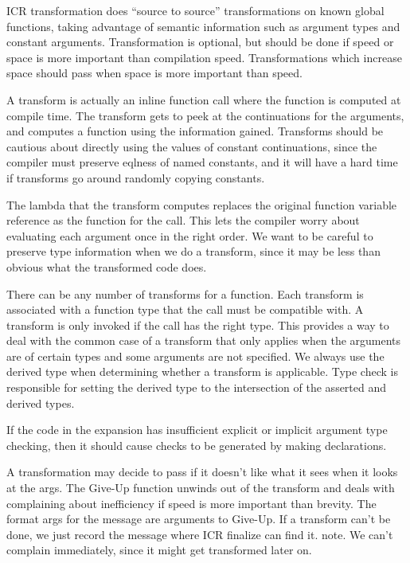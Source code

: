ICR transformation does ``source to source'' transformations on known global
functions, taking advantage of semantic information such as argument types and
constant arguments.  Transformation is optional, but should be done if speed or
space is more important than compilation speed.  Transformations which increase
space should pass when space is more important than speed.

A transform is actually an inline function call where the function is computed
at compile time.  The transform gets to peek at the continuations for the
arguments, and computes a function using the information gained.  Transforms
should be cautious about directly using the values of constant continuations,
since the compiler must preserve eqlness of named constants, and it will have a
hard time if transforms go around randomly copying constants.

The lambda that the transform computes replaces the original function variable
reference as the function for the call.  This lets the compiler worry about
evaluating each argument once in the right order.  We want to be careful to
preserve type information when we do a transform, since it may be less than
obvious what the transformed code does.

There can be any number of transforms for a function.  Each transform is
associated with a function type that the call must be compatible with.  A
transform is only invoked if the call has the right type.  This provides a way
to deal with the common case of a transform that only applies when the
arguments are of certain types and some arguments are not specified.  We always
use the derived type when determining whether a transform is applicable.  Type
check is responsible for setting the derived type to the intersection of the
asserted and derived types.

If the code in the expansion has insufficient explicit or implicit argument
type checking, then it should cause checks to be generated by making
declarations.

A transformation may decide to pass if it doesn't like what it sees when it
looks at the args.  The Give-Up function unwinds out of the transform and deals
with complaining about inefficiency if speed is more important than brevity.
The format args for the message are arguments to Give-Up.  If a transform can't
be done, we just record the message where ICR finalize can find it.  note.  We
can't complain immediately, since it might get transformed later on.


